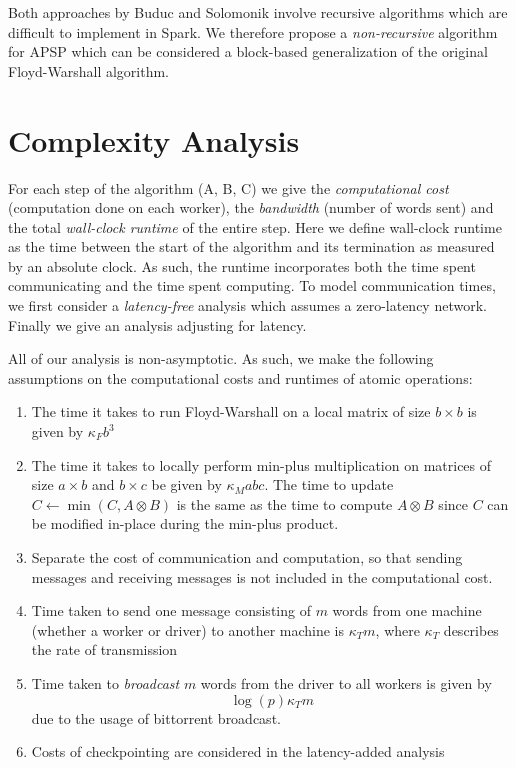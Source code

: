 \documentclass{article} %
\begin{document}
Both approaches by Buduc and Solomonik involve recursive algorithms
which are difficult to implement in Spark.  We therefore propose a
\emph{non-recursive} algorithm for APSP which can be considered a
block-based generalization of the original Floyd-Warshall algorithm.

\section{Complexity Analysis}

For each step of the algorithm (A, B, C) we give the \emph{computational cost} (computation done
on each worker), the \emph{bandwidth} (number of words sent) and the
total \emph{wall-clock runtime} of the entire step.  Here we define wall-clock runtime as
the time between the start of the algorithm and its termination as
measured by an absolute clock. As such, the runtime incorporates both
the time spent communicating and the time spent computing.  To model
communication times, we first consider a \emph{latency-free} analysis
which assumes a zero-latency network.  Finally we give an analysis
adjusting for latency.

All of our analysis is non-asymptotic.  As such, we make the following
assumptions on the computational costs and runtimes of atomic
operations:

\begin{enumerate}
\item The time it takes to run Floyd-Warshall on a local matrix of size $b \times b$ is given by $\kappa_F b^3$
\item The time it takes to locally perform min-plus multiplication on
  matrices of size $a \times b$ and $b \times c$ be given by $\kappa_M
  abc$. The time to update $C \leftarrow \min(C, A \otimes B)$ is the
  same as the time to compute $A \otimes B$ since $C$ can be modified in-place during the min-plus product.
\item Separate the cost of communication and computation, so that
  sending messages and receiving messages is not included in the
  computational cost.
\item Time taken to send one message consisting of $m$ words from one
  machine (whether a worker or driver) to another machine is $\kappa_T m$,
where $\kappa_T$ describes the rate of transmission
\item Time taken to \emph{broadcast} $m$ words from the driver to all workers is given by
\[
\log(p) \kappa_T m
\]
due to the usage of bittorrent broadcast.
\item Costs of checkpointing are considered in the latency-added analysis
\end{enumerate}
\end{document}
